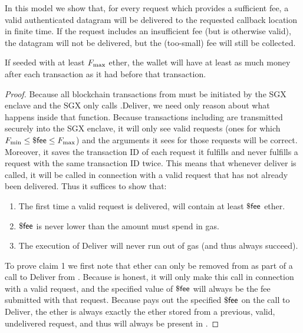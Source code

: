 In this model we show that, for every request which provides a sufficient fee,
a valid authenticated datagram will be delivered to the requested callback location in finite time.
If the request includes an insufficient fee (but is otherwise valid),
the datagram will not be delivered, but the (too-small) fee will still be collected.

\begin{lemma} \label{lem:non-bankrupt-p_sgx}
If seeded with at least $F_{\rm max}$ ether, the \sgxadd wallet will have
at least as much money after each transaction as it had before that transaction.
\end{lemma}

\begin{proof}

Because all blockchain transactions from \sgxadd must be initiated by the SGX enclave and the SGX only calls \tcont.Deliver,
we need only reason about what happens inside that function.
Because transactions including \tcont are transmitted securely into the SGX enclave, it will only see valid requests (ones for which $F_{\rm min} \leq \${\sf fee} \leq F_{\rm max}$) and the arguments it sees for those requests will be correct.
Moreover, it saves the transaction ID of each request it fulfills and never fulfills a request with the same transaction ID twice.
This means that whenever deliver is called, it will be called in connection with a valid request that has not already been delivered.
Thus it suffices to show that:
\begin{enumerate}
  \item The first time a valid request is delivered, \tcont will contain at least $\${\sf fee}$ ether.
  \item $\${\sf fee}$ is never lower than the amount \sgxadd must spend in gas.
  \item The execution of Deliver will never run out of gas (and thus always succeed).
\end{enumerate}

To prove claim 1 we first note that ether can only be removed from \tcont as part of a call to Deliver from \sgxadd.
Because \sgxadd is honest, it will only make this call in connection with a valid request, and the specified value of $\${\sf fee}$ will always be the fee submitted with that request.
Because \tcont pays out the specified $\${\sf fee}$ on the call to Deliver, the ether is always exactly the ether stored from a previous, valid, undelivered request, and thus will always be present in \tcont.


\end{proof}
